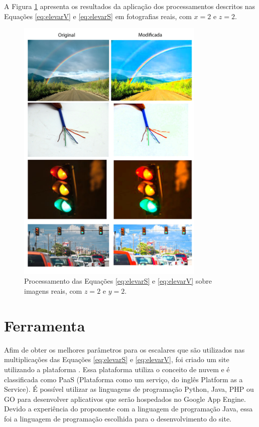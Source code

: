 \documentclass[	12pt, Times, openright, twoside, a4paper, english, brazil]{abntex2}
\begin{document}
A Figura \ref{fig:figuraRealVeS} apresenta os resultados da aplicação dos processamentos descritos nas Equações \ref{eq:elevarV} e \ref{eq:elevarS} em fotografias reais, com $x = 2$ e $z = 2$.

\begin{figure}[!htb]
\centering \includegraphics[width=0.80\textwidth]{figuraRealSeV.jpg}
\caption{Processamento das Equações \ref{eq:elevarS} e \ref{eq:elevarV} sobre imagens reais, com $z = 2$ e $y = 2$. \label{fig:figuraRealVeS}}
\end{figure}

\section{Ferramenta}


Afim de obter os melhores parâmetros para os escalares que são utilizados nas multiplicações das Equações \ref{eq:elevarS} e \ref{eq:elevarV}, foi criado um site utilizando a plataforma . Essa plataforma utiliza o conceito de nuvem e é classificada como PaaS (Plataforma como um serviço, do inglês Platform as a Service). É possível utilizar as linguagens de programação Python, Java, PHP ou GO para desenvolver aplicativos que serão hospedados no Google App Engine. Devido a experiência do proponente com a linguagem de programação Java, essa foi a linguagem de programação escolhida para o desenvolvimento do site. 
\end{document}
